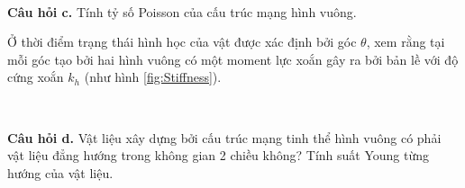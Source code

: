\ \ 

\textbf{Câu hỏi c.} Tính tỷ số Poisson của cấu trúc mạng hình vuông.

Ở thời điểm trạng thái hình học của vật được xác định bởi góc \(\theta\), xem rằng tại mỗi góc tạo bởi hai hình vuông có một moment lực xoắn gây ra bởi bản lề với độ cứng xoắn \(k_h\) (như hình \ref{fig:Stiffness}).

\ \ 

\textbf{Câu hỏi d.} Vật liệu xây dựng bởi cấu trúc mạng tinh thể hình vuông có phải vật liệu đẳng hướng trong không gian 2 chiều không? Tính suất Young từng hướng của vật liệu.
